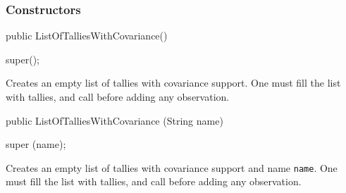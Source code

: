 \subsubsection*{Constructors}
\begin{code}

   public ListOfTalliesWithCovariance()\begin{hide} {
      super();
   }\end{hide}
\end{code}
\begin{tabb}   Creates an empty list of tallies with covariance support.
   One must fill the list with tallies, and call  before
  adding any observation.
\end{tabb}
\begin{code}

   public ListOfTalliesWithCovariance (String name)\begin{hide} {
      super (name);
   }\end{hide}
\end{code}
\begin{tabb}   Creates an empty list of tallies with covariance
  support and name \texttt{name}.
   One must fill the list with tallies, and call  before
  adding any observation.
\end{tabb}
\begin{htmlonly}
\end{htmlonly}
